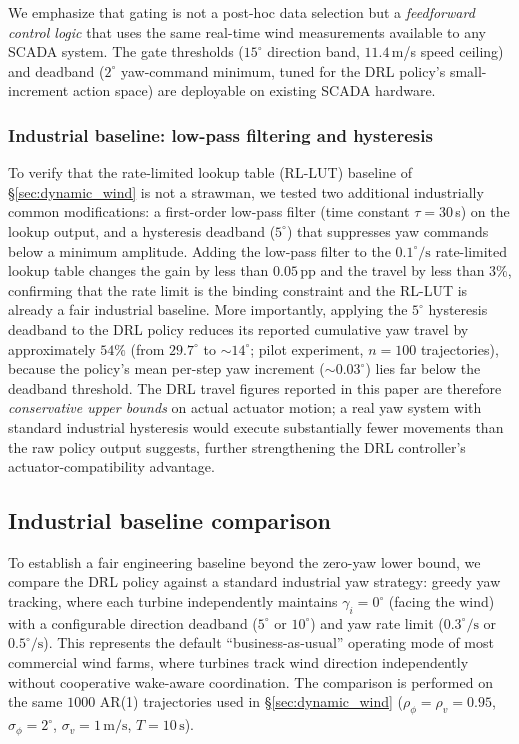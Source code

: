 \documentclass[final,5p,times]{elsarticle}
\begin{document}
We emphasize that gating is not a post-hoc data selection but a \emph{feedforward control logic} that uses the same real-time wind measurements available to any SCADA system. The gate thresholds ($15^\circ$ direction band, $11.4$\,m/s speed ceiling) and deadband ($2^\circ$ yaw-command minimum, tuned for the DRL policy's small-increment action space) are deployable on existing SCADA hardware.

\subsubsection{Industrial baseline: low-pass filtering and hysteresis}
To verify that the rate-limited lookup table (RL-LUT) baseline of \S\ref{sec:dynamic_wind} is not a strawman, we tested two additional industrially common modifications: a first-order low-pass filter (time constant $\tau{=}30$\,s) on the lookup output, and a hysteresis deadband ($5^\circ$) that suppresses yaw commands below a minimum amplitude. Adding the low-pass filter to the $0.1^\circ\!/\mathrm{s}$ rate-limited lookup table changes the gain by less than $0.05$\,pp and the travel by less than $3\%$, confirming that the rate limit is the binding constraint and the RL-LUT is already a fair industrial baseline. More importantly, applying the $5^\circ$ hysteresis deadband to the DRL policy reduces its reported cumulative yaw travel by approximately $54\%$ (from $29.7^\circ$ to ${\sim}14^\circ$; pilot experiment, $n{=}100$ trajectories), because the policy's mean per-step yaw increment (${\sim}0.03^\circ$) lies far below the deadband threshold. The DRL travel figures reported in this paper are therefore \emph{conservative upper bounds} on actual actuator motion; a real yaw system with standard industrial hysteresis would execute substantially fewer movements than the raw policy output suggests, further strengthening the DRL controller's actuator-compatibility advantage.

\subsection{Industrial baseline comparison}\label{sec:industrial_baseline}
To establish a fair engineering baseline beyond the zero-yaw lower bound, we compare the DRL policy against a standard industrial yaw strategy: greedy yaw tracking, where each turbine independently maintains $\gamma_i{=}0^\circ$ (facing the wind) with a configurable direction deadband ($5^\circ$ or $10^\circ$) and yaw rate limit ($0.3^\circ\!/\!\mathrm{s}$ or $0.5^\circ\!/\!\mathrm{s}$). This represents the default ``business-as-usual'' operating mode of most commercial wind farms, where turbines track wind direction independently without cooperative wake-aware coordination. The comparison is performed on the same $1000$ AR(1) trajectories used in \S\ref{sec:dynamic_wind} ($\rho_\phi{=}\rho_v{=}0.95$, $\sigma_\phi{=}2^\circ$, $\sigma_v{=}1\,\mathrm{m/s}$, $T{=}10\,\mathrm{s}$).
\end{document}
